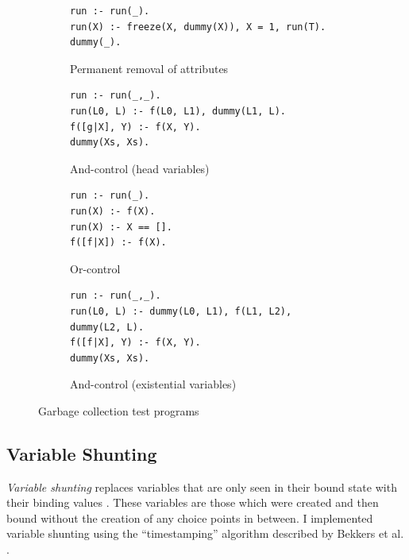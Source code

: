\begin{figure}[H]
\centering
\begin{subfigure}{\textwidth}
\centering
\begin{verbatim}
run :- run(_).
run(X) :- freeze(X, dummy(X)), X = 1, run(T).
dummy(_).
\end{verbatim}
\caption{Permanent removal of attributes}
\end{subfigure}
\par\bigskip
\par\bigskip
\begin{subfigure}{.65\textwidth}
\centering
\begin{verbatim}
run :- run(_,_).
run(L0, L) :- f(L0, L1), dummy(L1, L).
f([g|X], Y) :- f(X, Y).
dummy(Xs, Xs).
\end{verbatim}
\caption{And-control (head variables)}
\end{subfigure}%
\begin{subfigure}{.35\textwidth}
\centering
\begin{verbatim}
run :- run(_).
run(X) :- f(X).
run(X) :- X == [].
f([f|X]) :- f(X).
\end{verbatim}
\caption{Or-control}
\label{fig:or-control}
\end{subfigure}
\par\bigskip
\par\bigskip
\begin{subfigure}{\textwidth}
\centering
\begin{verbatim}
run :- run(_,_).
run(L0, L) :- dummy(L0, L1), f(L1, L2), dummy(L2, L).
f([f|X], Y) :- f(X, Y).
dummy(Xs, Xs).
\end{verbatim}
\caption{And-control (existential variables)}
\end{subfigure}
\caption{Garbage collection test programs}
\label{fig:gc-programs}
\end{figure}

\subsection{Variable Shunting}

\label{sec:variable-shunting}

\emph{Variable shunting} replaces variables that are only seen in their bound state with their binding values \cite{sahlinVariableShuntingWAM1991}. These variables are those which were created and then bound without the creation of any choice points in between. I implemented variable shunting using the ``timestamping'' algorithm described by Bekkers et al. \cite{bekkersDynamicMemoryManagement1992}.

